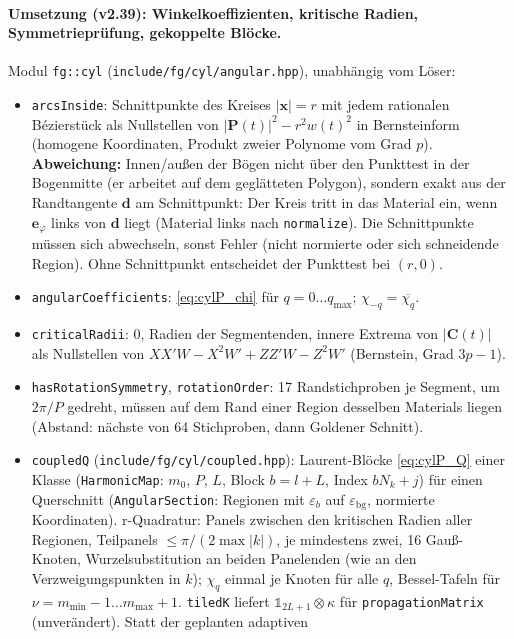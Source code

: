 \paragraph{Umsetzung (v2.39): Winkelkoeffizienten, kritische Radien, Symmetrieprüfung, gekoppelte Blöcke.}
Modul \verb|fg::cyl| (\verb|include/fg/cyl/angular.hpp|), unabhängig vom Löser:
\begin{itemize}[nosep]
  \item \verb|arcsInside|: Schnittpunkte des Kreises $|\mathbf x|=r$ mit jedem rationalen Bézierstück als Nullstellen von
        $|\mathbf P(t)|^2-r^2w(t)^2$ in Bernsteinform (homogene Koordinaten, Produkt zweier Polynome vom Grad $p$).
        \textbf{Abweichung:} Innen/außen der Bögen nicht über den Punkttest in der Bogenmitte (er arbeitet auf dem
        geglätteten Polygon), sondern exakt aus der Randtangente $\mathbf d$ am Schnittpunkt: Der Kreis tritt in das
        Material ein, wenn $\mathbf e_\varphi$ links von $\mathbf d$ liegt (Material links nach \verb|normalize|). Die
        Schnittpunkte müssen sich abwechseln, sonst Fehler (nicht normierte oder sich schneidende Region). Ohne
        Schnittpunkt entscheidet der Punkttest bei $(r,0)$.
  \item \verb|angularCoefficients|: \eqref{eq:cylP_chi} für $q=0\dots q_{\max}$; $\chi_{-q}=\overline{\chi_q}$.
  \item \verb|criticalRadii|: $0$, Radien der Segmentenden, innere Extrema von $|\mathbf C(t)|$ als Nullstellen von
        $XX'W-X^2W'+ZZ'W-Z^2W'$ (Bernstein, Grad $3p-1$).
  \item \verb|hasRotationSymmetry|, \verb|rotationOrder|: 17 Randstichproben je Segment, um $2\pi/P$ gedreht, müssen
        auf dem Rand einer Region desselben Materials liegen (Abstand: nächste von 64 Stichproben, dann Goldener Schnitt).
  \item \verb|coupledQ| (\verb|include/fg/cyl/coupled.hpp|): Laurent-Blöcke \eqref{eq:cylP_Q} einer Klasse
        (\verb|HarmonicMap|: $m_0$, $P$, $L$, Block $b=l+L$, Index $bN_k+j$) für einen Querschnitt
        (\verb|AngularSection|: Regionen mit $\varepsilon_b$ auf $\varepsilon_{\text{bg}}$, normierte Koordinaten).
        r-Quadratur: Panels zwischen den kritischen Radien aller Regionen, Teilpanels $\le\pi/(2\max|k|)$, je mindestens
        zwei, 16 Gauß-Knoten, Wurzelsubstitution an beiden Panelenden (wie an den Verzweigungspunkten in $k$); $\chi_q$
        einmal je Knoten für alle $q$, Bessel-Tafeln für $\nu=m_{\min}-1\dots m_{\max}+1$. \verb|tiledK| liefert
        $\mathbb 1_{2L+1}\otimes\kappa$ für \verb|propagationMatrix| (unverändert). Statt der geplanten adaptiven

\end{itemize}
